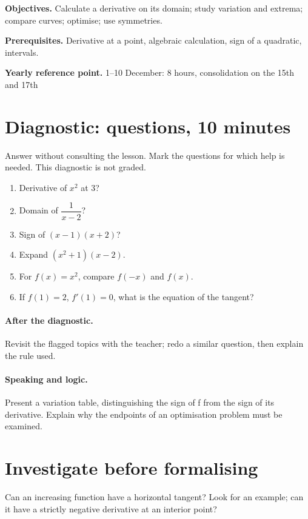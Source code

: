 \label{C06}
\begin{keypoint}
\textbf{Objectives.} Calculate a derivative on its domain; study variation and extrema; compare curves; optimise; use symmetries.

\textbf{Prerequisites.} Derivative at a point, algebraic calculation, sign of a quadratic, intervals.

\textbf{Yearly reference point.} 1--10 December: 8 hours, consolidation on the 15th and 17th\end{keypoint}
\section*{Diagnostic:  questions, 10 minutes}\label{C06-D}
Answer without consulting the lesson. Mark the questions for which help is needed. This diagnostic is not graded.
\begin{enumerate}
\item Derivative of $x^2$ at 3?
\item Domain of $\dfrac{1}{x-2}$?
\item Sign of $(x-1)(x+2)$?
\item Expand $(x^2+1)(x-2)$.
\item For $f(x)=x^2$, compare $f(-x)$ and $f(x)$.
\item If $f(1)=2$, $f\prime(1)=0$, what is the equation of the tangent?
\end{enumerate}
\paragraph{After the diagnostic.} Revisit the flagged topics with the teacher; redo a similar question, then explain the rule used.
\paragraph{Speaking and logic.} Present a variation table, distinguishing the sign of f from the sign of its derivative. Explain why the endpoints of an optimisation problem must be examined.
\mxnewpage
\section*{Investigate before formalising}\label{C06-RECH}
Can an increasing function have a horizontal tangent? Look for an example; can it have a strictly negative derivative at an interior point?

